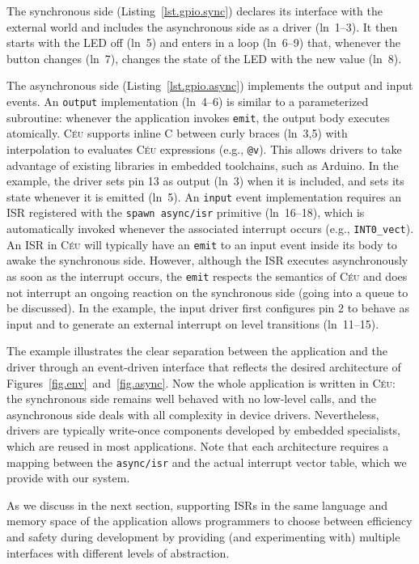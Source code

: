 \documentclass[sigplan,10pt,review,anonymous]{acmart}\settopmatter{printfolios=true,printccs=false,printacmref=false}
\newcommand{\CEU}{\textsc{C\'{e}u}\xspace}
\newcommand{\code}[1] {{\small{\texttt{#1}}}}
\begin{document}
The synchronous side (Listing~\ref{lst.gpio.sync}) declares its interface with
the external world and includes the asynchronous side as a driver (ln~1--3).
It then starts with the LED off (ln~5) and enters in a loop (ln~6--9) that,
whenever the button changes (ln~7), changes the state of the LED with the new
value (ln~8).

The asynchronous side (Listing~\ref{lst.gpio.async}) implements the output and
input events.
%
An \code{output} implementation (ln~4--6) is similar to a parameterized
subroutine: whenever the application invokes \code{emit}, the output body
executes atomically.
\CEU supports inline C between curly braces (ln~3,5) with interpolation to
evaluates \CEU expressions (e.g., \code{@v}).
This allows drivers to take advantage of existing libraries in embedded
toolchains, such as Arduino.
%
In the example, the driver sets pin 13 as output (ln~3) when it is included,
and sets its state whenever it is emitted (ln~5).
%
An \code{input} event implementation requires an ISR registered with the
\code{spawn async/isr} primitive (ln~16--18), which is automatically invoked
whenever the associated interrupt occurs (e.g., \code{INT0\_vect}).
%
An ISR in \CEU will typically have an \code{emit} to an input event inside its
body to awake the synchronous side.
However, although the ISR executes asynchronously as soon as the interrupt
occurs, the \code{emit} respects the semantics of \CEU and does not interrupt
an ongoing reaction on the synchronous side (going into a queue to be
discussed).
%
In the example, the input driver first configures pin 2 to behave as input and
to generate an external interrupt on level transitions (ln~11--15).

The example illustrates the clear separation between the application and the
driver through an event-driven interface that reflects the desired architecture
of Figures~\ref{fig.env}~and~\ref{fig.async}.
%
Now the whole application is written in \CEU:
    the synchronous side remains well behaved with no low-level calls, and
    the asynchronous side deals with all complexity in device drivers.
%
Nevertheless, drivers are typically write-once components developed by embedded
specialists, which are reused in most applications.
%
Note that each architecture requires a mapping between the \code{async/isr} and
the actual interrupt vector table, which we provide with our system.

As we discuss in the next section, supporting ISRs in the same language and
memory space of the application allows programmers to choose between efficiency
and safety during development by providing (and experimenting with) multiple
interfaces with different levels of abstraction.
\end{document}
